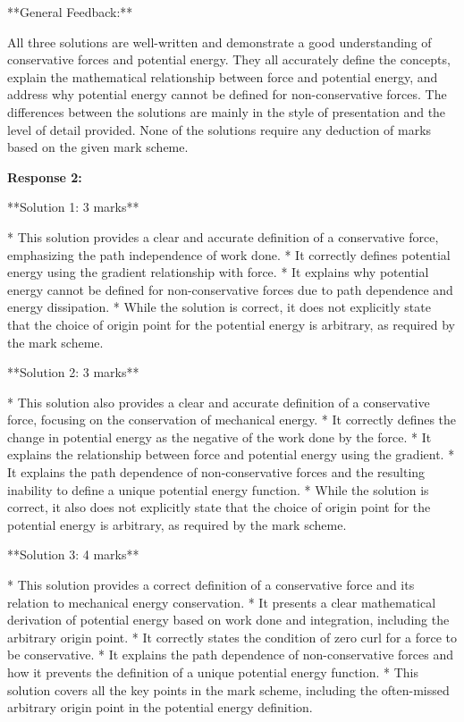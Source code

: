 \documentclass[a4paper,11pt]{article}
\begin{document}
**General Feedback:**

All three solutions are well-written and demonstrate a good understanding of conservative forces and potential energy. They all accurately define the concepts, explain the mathematical relationship between force and potential energy, and address why potential energy cannot be defined for non-conservative forces. The differences between the solutions are mainly in the style of presentation and the level of detail provided. None of the solutions require any deduction of marks based on the given mark scheme.

\bigskip    
\textbf{Response 2:}

**Solution 1: 3 marks**

* This solution provides a clear and accurate definition of a conservative force, emphasizing the path independence of work done.
* It correctly defines potential energy using the gradient relationship with force.
* It explains why potential energy cannot be defined for non-conservative forces due to path dependence and energy dissipation.
* While the solution is correct, it does not explicitly state that the choice of origin point for the potential energy is arbitrary, as required by the mark scheme.

**Solution 2: 3 marks**

* This solution also provides a clear and accurate definition of a conservative force, focusing on the conservation of mechanical energy.
* It correctly defines the change in potential energy as the negative of the work done by the force.
* It explains the relationship between force and potential energy using the gradient.
* It explains the path dependence of non-conservative forces and the resulting inability to define a unique potential energy function.
* While the solution is correct, it also does not explicitly state that the choice of origin point for the potential energy is arbitrary, as required by the mark scheme.

**Solution 3: 4 marks**

* This solution provides a correct definition of a conservative force and its relation to mechanical energy conservation.
* It presents a clear mathematical derivation of potential energy based on work done and integration, including the arbitrary origin point.
* It correctly states the condition of zero curl for a force to be conservative.
* It explains the path dependence of non-conservative forces and how it prevents the definition of a unique potential energy function.
* This solution covers all the key points in the mark scheme, including the often-missed arbitrary origin point in the potential energy definition.
\end{document}
